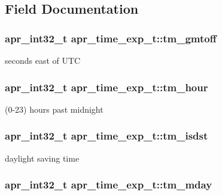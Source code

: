 \subsection{Field Documentation}
\hypertarget{structapr__time__exp__t_a1102ca16ed70b1c707473431eed58d7b}{
\subsubsection[{tm\-\_\-gmtoff}]{\setlength{\rightskip}{0pt plus 5cm}apr\-\_\-int32\-\_\-t apr\-\_\-time\-\_\-exp\-\_\-t\-::tm\-\_\-gmtoff}}\label{structapr__time__exp__t_a1102ca16ed70b1c707473431eed58d7b}
seconds east of U\-T\-C \hypertarget{structapr__time__exp__t_a2dbab1d10ed6234c8e9e714e13b7911c}{
\subsubsection[{tm\-\_\-hour}]{\setlength{\rightskip}{0pt plus 5cm}apr\-\_\-int32\-\_\-t apr\-\_\-time\-\_\-exp\-\_\-t\-::tm\-\_\-hour}}\label{structapr__time__exp__t_a2dbab1d10ed6234c8e9e714e13b7911c}
(0-\/23) hours past midnight \hypertarget{structapr__time__exp__t_a4d899f1fb9fde3c6b6893941fa81b1c8}{
\subsubsection[{tm\-\_\-isdst}]{\setlength{\rightskip}{0pt plus 5cm}apr\-\_\-int32\-\_\-t apr\-\_\-time\-\_\-exp\-\_\-t\-::tm\-\_\-isdst}}\label{structapr__time__exp__t_a4d899f1fb9fde3c6b6893941fa81b1c8}
daylight saving time \hypertarget{structapr__time__exp__t_a6c09a274f011841e9e988c3c9504848a}{
\subsubsection[{tm\-\_\-mday}]{\setlength{\rightskip}{0pt plus 5cm}apr\-\_\-int32\-\_\-t apr\-\_\-time\-\_\-exp\-\_\-t\-::tm\-\_\-mday}}\label{structapr__time__exp__t_a6c09a274f011841e9e988c3c9504848a}
